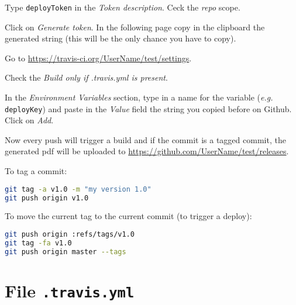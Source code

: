 \documentclass[12pt]{article}
\begin{document}
Type \texttt{deployToken} in the \emph{Token description}. Ceck the \emph{repo} scope.

Click on \emph{Generate token}. In the following page copy in the clipboard the generated string (this will be the only chance you have to copy).

Go to \url{https://travis-ci.org/UserName/test/settings}. 

Check the \emph{Build only if .travis.yml is present}.

In the \emph{Environment Variables} section, type in a name for the variable (\emph{e.g.} \texttt{deployKey}) and paste in the \emph{Value} field the string you copied before on Github. Click on \emph{Add}.

Now every push will trigger a build and if the commit is a tagged commit, the generated pdf will be uploaded to \url{https://github.com/UserName/test/releases}.

To tag a commit:
\begin{lstlisting}[language=Bash] 
git tag -a v1.0 -m "my version 1.0"
git push origin v1.0
\end{lstlisting}

To move the current tag to the current commit (to trigger a deploy):
\begin{lstlisting}[language=Bash] 
git push origin :refs/tags/v1.0
git tag -fa v1.0
git push origin master --tags
\end{lstlisting}

\section*{File \texttt{.travis.yml}}


\end{document}
